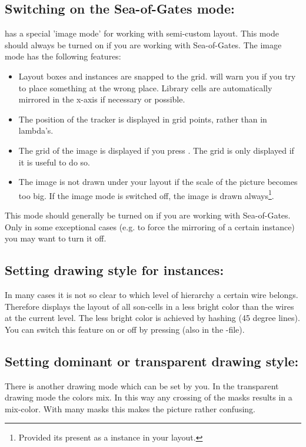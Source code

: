 \subsection{Switching on the Sea-of-Gates mode: \protect{}}
\label{sogmode}
 has a special 'image mode' for working with semi-custom
layout. This mode should always be turned on if you are working with
Sea-of-Gates. The image mode has the following features:
\begin{itemize}
\item
Layout boxes and instances are snapped to the grid.  will
warn you if you try to place something at the wrong place. Library
cells are automatically mirrored in the x-axis if necessary or possible. 
\item
The position of the tracker is displayed in grid points, rather than in
lambda's. 
\item 
The grid of the image is displayed if you press .
The grid is only displayed if it is useful to do so.
\item 
The image is not drawn under your layout if the scale of the picture becomes
too big. If the image mode is switched off, the image is drawn
always\footnote{Provided its present as a instance in your layout.}.
\end{itemize}
This mode should generally be turned on if you are working with
Sea-of-Gates. Only in some exceptional cases (e.g. to force the
mirroring of a certain instance) you may want to turn it off.

\subsection{Setting drawing style for instances: \protect{}}
\label{hashed}
In many cases it is not so clear to which level of hierarchy a certain
wire belongs. Therefore  displays the layout of all
son-cells in a less bright color than the wires at the current level.
The less bright color is achieved by hashing (45 degree lines). You can
switch this feature on or off by pressing  (also in the
-file). 

\subsection{Setting dominant or transparent drawing style:
\protect{}}
There is another drawing mode which can be set by you.  In the
transparent drawing mode the colors mix. In this way any crossing of
the masks results in a mix-color.  With many masks this makes the
picture rather confusing.

